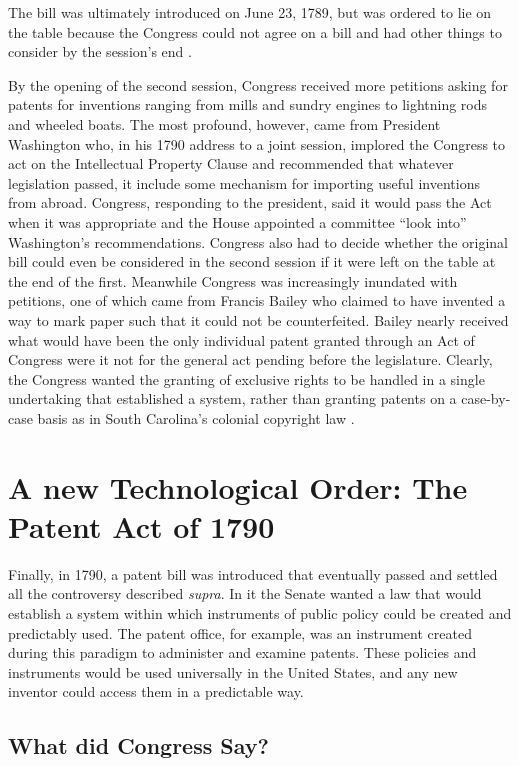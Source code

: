 \documentclass[pdftex,11pt,letterpaper]{article}
\begin{document}
The bill was ultimately introduced on June 23, 1789, but was ordered to lie on the table because the Congress could not agree on a bill and had other things to consider by the session's end \autocite{Walterscheid1997}.

By the opening of the second session, Congress received more petitions asking for patents for inventions ranging from mills and sundry engines to lightning rods and wheeled boats. The most profound, however, came from President Washington who, in his 1790 address to a joint session, implored the Congress to act on the Intellectual Property Clause and recommended that whatever legislation passed, it include some mechanism for importing useful inventions from abroad. Congress, responding to the president, said it would pass the Act when it was appropriate and the House appointed a committee ``look into'' Washington's recommendations. Congress also had to decide whether the original bill could even be considered in the second session if it were left on the table at the end of the first. Meanwhile Congress was increasingly inundated with petitions, one of which came from Francis Bailey who claimed to have invented a way to mark paper such that it could not be counterfeited. Bailey nearly received what would have been the only individual patent granted through an Act of Congress were it not for the general act pending before the legislature. Clearly, the Congress wanted the granting of exclusive rights to be handled in a single undertaking that established a system, rather than granting patents on a case-by-case basis as in South Carolina's colonial copyright law \autocite[492-498]{walterscheid1997}.

\section{A new Technological Order: The Patent Act of 1790}

Finally, in 1790, a patent bill was introduced that eventually passed and settled all the controversy described \textit{supra}. In it the Senate wanted a law that would establish a system within which instruments of public policy could be created and predictably used. The patent office, for example, was an instrument created during this paradigm to administer and examine patents. These policies and instruments would be used universally in the United States, and any new inventor could access them in a predictable way.

\subsection{What did Congress Say?}
\end{document}
